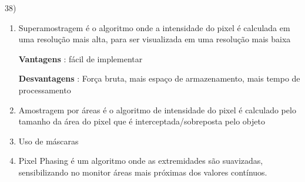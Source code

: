 \begin{question}

 	        38) \begin{enumerate}[label=\alph*.]
					\setlength\itemsep{1em}
		
					\item Superamostragem é o algoritmo onde a intensidade do pixel é calculada em uma resolução
					mais alta, para ser visualizada em uma resolução mais baixa
					
					\textbf{Vantagens} :  fácil de implementar
					
					\textbf{Desvantagens} : Força bruta, mais espaço de armazenamento, mais
					tempo de processamento
		
					\item Amostragem por áreas é o algoritmo de intensidade do pixel é calculado pelo tamanho da 	  		área do pixel que é interceptada/sobreposta pelo objeto
		
					\item Uso de máscaras
					
					\item Pixel Phasing é um algoritmo onde as extremidades são suavizadas, sensibilizando no monitor áreas mais próximas dos valores contínuos.
									
 			  \end{enumerate}
 			  
\end{question}